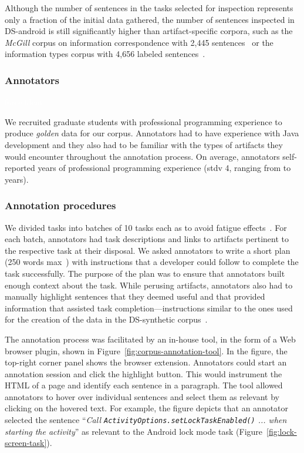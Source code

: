 Although the number of sentences in the tasks selected for inspection represents 
only a fraction of the initial data gathered, 
the number of sentences inspected in \acs{DS-android}
is still significantly higher than 
artifact-specific corpora, such as the \textit{McGill} corpus on information correspondence with 2,445 sentences~\cite{arya2020} or the information types corpus with 4,656 labeled sentences~\cite{Arya2019}.


\subsubsection{Annotators}
\textcolor{white}{force ident} %

We recruited  graduate students with professional programming experience to produce \textit{golden} data for our corpus. Annotators had to have experience with Java development and they also had to be familiar with the types of artifacts they would encounter throughout the annotation process. 
On average, annotators self-reported  years of professional
programming experience (stdv 4, ranging from  to  years).



\subsubsection{Annotation procedures}



We divided tasks into batches of 10 tasks each as to avoid fatigue effects~\cite{Ponzanelli2017}. For each batch, annotators had task descriptions and links to artifacts pertinent to the respective task at their disposal. We asked annotators to write a short plan (250 words max~\cite{Rastkar2010}) with instructions that a developer could follow to complete the task successfully. 
The purpose of the plan was to ensure that annotators built enough context about the task.
While perusing artifacts, annotators also had to manually highlight sentences that they deemed useful and that provided information that assisted task completion---instructions similar to the ones used for the creation of the data in the \acs{DS-synthetic} corpus~\cite{marques2020}.


The annotation process was facilitated by an in-house tool, in the form of a Web browser plugin, shown in Figure~\ref{fig:corpus-annotation-tool}. In the figure, the top-right corner panel shows the browser extension. Annotators could start an annotation session and click the highlight button.
This would instrument the HTML of a page and identify each sentence in a paragraph. The tool allowed annotators to hover over individual sentences and select them as relevant by clicking on the hovered text. For example, the figure depicts that an annotator selected  the sentence
``\textit{Call {\small \texttt{ActivityOptions.setLockTaskEnabled()}} ... when starting the activity}'' as relevant to the Android lock mode task (Figure~\ref{fig:lock-screen-task}).







